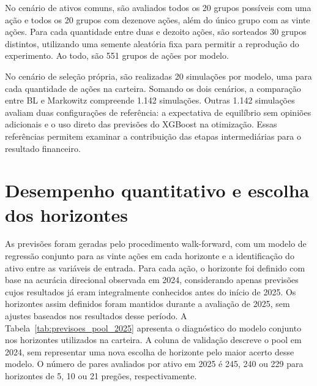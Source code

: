 No cenário de ativos comuns, são avaliados todos os 20 grupos
possíveis com uma ação e todos os 20 grupos com dezenove ações,
além do único grupo com as vinte ações. Para cada quantidade
entre duas e dezoito ações, são sorteados 30 grupos distintos,
utilizando uma semente aleatória fixa para permitir a reprodução do
experimento. Ao todo, são 551 grupos de ações por modelo.

No cenário de seleção própria, são realizadas 20 simulações
por modelo, uma para cada quantidade de ações na carteira.
Somando os dois cenários, a comparação entre BL
e Markowitz compreende 1.142 simulações. Outras 1.142 simulações
avaliam duas configurações de referência: a expectativa de
equilíbrio sem opiniões adicionais e o uso direto das previsões
do XGBoost na otimização. Essas referências permitem examinar
a contribuição das etapas intermediárias para o resultado
financeiro.

\section{Desempenho quantitativo e escolha dos horizontes}
As previsões foram geradas pelo procedimento walk-forward, com
um modelo de regressão conjunto para as vinte ações em cada
horizonte e a identificação do ativo entre as variáveis de
entrada. Para cada ação, o horizonte foi definido com base na
acurácia direcional observada em 2024, considerando apenas
previsões cujos resultados já eram integralmente conhecidos
antes do início de 2025. Os horizontes assim definidos foram
mantidos durante a avaliação de 2025, sem ajustes baseados nos
resultados desse período. A Tabela~\ref{tab:previsoes_pool_2025} apresenta o diagnóstico do modelo conjunto nos horizontes utilizados na carteira. A coluna de validação descreve o pool em 2024, sem representar uma nova escolha de horizonte pelo maior acerto desse modelo. O número de pares avaliados por ativo em 2025 é 245, 240 ou 229 para horizontes de 5, 10 ou 21 pregões, respectivamente.

